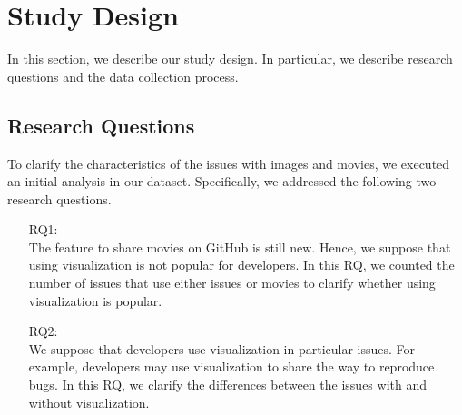 \section{Study Design}
\label{sec:design}

In this section, we describe our study design. 
In particular, we describe research questions and 
the data collection process.

\subsection{Research Questions}
\label{sec:rqs}

To clarify the characteristics of 
the issues with images and movies, 
we executed an initial analysis 
in our dataset. 
Specifically, we addressed the following 
two research questions. 
\begin{itemize}
	\item[RQ1:] \textbf{\RQone{}}\\
	The feature to share movies on GitHub 
	is still new. 
	Hence, we suppose that using visualization 
	is not popular for developers. 
	In this RQ, we counted the number of 
	issues that use either issues or movies 
	to clarify whether using visualization 
	is popular. 
	\item[RQ2:] \textbf{\RQtwo{}}\\
	We suppose that developers use visualization 
	in particular issues. 
	For example, developers may use visualization 
	to share the way to reproduce bugs. 
	In this RQ, we clarify the differences 
	between the issues with and without 
	visualization. 
\end{itemize}



